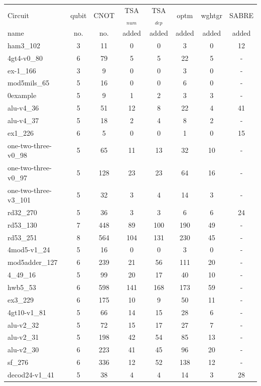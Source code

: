 \documentclass[runningheads]{llncs}
\begin{document}
	\begin{table}[!ht]
		\begin{center}  
		\begin{tabular}{|p{4.3cm}<{\centering}|c|c|c|c|c|c|c|}
		\hline
		Circuit &  qubit  & CNOT &TSA$_{num}$& TSA$_{dep}$  & optm 	 & wghtgr  &SABRE 	\\
		 name	&   no. 	&	no. & added&  added &  added 	&  added &  added\\
		\hline
		ham3\_102 & 3 & 11 & 0 & 0 & 3 & 0& 12 \\
		4gt4-v0\_80 & 6 & 79 & 5 & 5 & 22 & 5& - \\
		ex-1\_166 & 3 & 9 & 0 & 0 & 3 & 0& - \\
mod5mils\_65 & 5 & 16 & 0 & 0 & 6 & 0& - \\
0example & 5 & 9 & 1 & 2 & 3 & 3& - \\
alu-v4\_36 & 5 & 51 & 12 & 8 & 22 & 4& 41 \\
alu-v4\_37 & 5 & 18 & 2 & 4 & 8 & 2& - \\
ex1\_226 & 6 & 5 & 0 & 0 & 1 & 0& 15 \\
one-two-three-v0\_98 & 5 & 65 & 11 & 13 & 32 & 10& - \\
one-two-three-v0\_97 & 5 & 128 & 23 & 23 & 64 & 16& - \\
one-two-three-v3\_101 & 5 & 32 & 3 & 4 & 14 & 3& - \\
rd32\_270 & 5 & 36 & 3 & 3 & 6 & 6 &24\\
		rd53\_130 & 7 & 448 & 89 & 100 & 190 & 49& - \\
rd53\_251 & 8 & 564 & 104 & 131 & 230 & 45& - \\
4mod5-v1\_24 & 5 & 16 & 0 & 0 & 3 & 0& - \\
mod5adder\_127 & 6 & 239 & 21 & 56 & 111 & 20& - \\
4\_49\_16 & 5 & 99 & 20 & 17 & 40 & 10& - \\
hwb5\_53 & 6 & 598 & 141 & 168 & 173 & 59& - \\
ex3\_229 & 6 & 175 & 10 & 9 & 50 & 11& - \\
4gt10-v1\_81 & 5 & 66 & 14 & 15 & 28 & 6& - \\
alu-v2\_32 & 5 & 72 & 15 & 17 & 27 & 7& - \\
alu-v2\_31 & 5 & 198 & 42 & 54 & 85 & 13& - \\
alu-v2\_30 & 6 & 223 & 41 & 45 & 96 & 20& - \\
sf\_276 & 6 & 336 & 12 & 52 & 138 & 12& - \\
decod24-v1\_41 & 5 & 38 & 4 & 4 & 14 & 3& 28 \\

\end{tabular}
\end{center}
\end{table}
\end{document}
